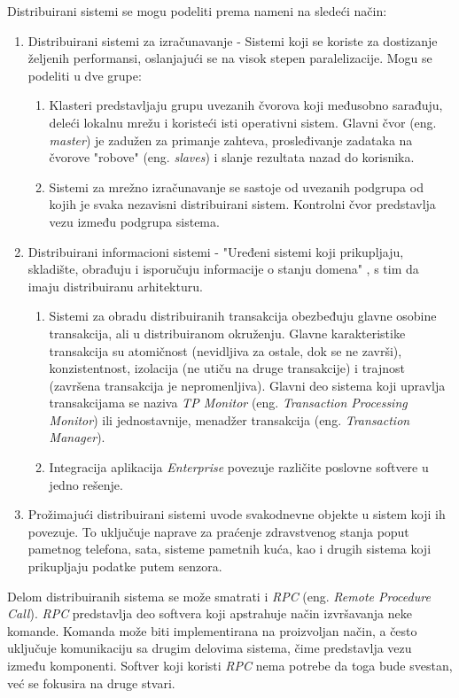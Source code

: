 \documentclass[12pt,oneside]{memoir}
\begin{document}
Distribuirani sistemi se mogu podeliti prema nameni na sledeći način:
\begin{enumerate}
\item Distribuirani sistemi za izračunavanje - Sistemi koji se koriste za dostizanje željenih performansi, oslanjajući se na visok stepen paralelizacije. Mogu se podeliti u dve grupe:
	\begin{enumerate}
	\item Klasteri predstavljaju grupu uvezanih čvorova koji međusobno sarađuju, deleći lokalnu mrežu i koristeći isti operativni sistem. Glavni čvor (eng. \emph{master}) je zadužen za primanje zahteva, prosleđivanje zadataka na čvorove "robove" (eng. \emph{slaves}) i slanje rezultata nazad do korisnika.
	\item Sistemi za mrežno izračunavanje se sastoje od uvezanih podgrupa od kojih je svaka nezavisni distribuirani sistem. Kontrolni čvor predstavlja vezu između podgrupa sistema.
	\end{enumerate}
\item Distribuirani informacioni sistemi - "Uređeni sistemi koji prikupljaju, skladište, obrađuju i isporučuju informacije o stanju domena" \cite{OliveIS}, s tim da imaju distribuiranu arhitekturu.
	\begin{enumerate}
	\item Sistemi za obradu distribuiranih transakcija obezbeđuju glavne osobine transakcija, ali u distribuiranom okruženju. Glavne karakteristike transakcija su atomičnost (nevidljiva za ostale, dok se ne završi), konzistentnost, izolacija (ne utiču na druge transakcije) i trajnost (završena transakcija je nepromenljiva). Glavni deo sistema koji upravlja transakcijama se naziva \emph{TP Monitor} (eng. \emph{Transaction Processing Monitor}) ili jednostavnije, menadžer transakcija (eng. \emph{Transaction Manager}).
	\item Integracija aplikacija \emph{Enterprise} povezuje različite poslovne softvere u jedno rešenje.
	\end{enumerate}
\item Prožimajući distribuirani sistemi uvode svakodnevne objekte u sistem koji ih povezuje. To uključuje naprave za praćenje zdravstvenog stanja poput pametnog telefona, sata, sisteme pametnih kuća, kao i drugih sistema koji prikupljaju podatke putem senzora.
\end{enumerate}

Delom distribuiranih sistema se može smatrati i \emph{RPC} (eng. \emph{Remote Procedure Call}). \emph{RPC} predstavlja deo softvera koji apstrahuje način izvršavanja neke komande. Komanda može biti implementirana na proizvoljan način, a često uključuje komunikaciju sa drugim delovima sistema, čime predstavlja vezu između komponenti. Softver koji koristi \emph{RPC} nema potrebe da toga bude svestan, već se fokusira na druge stvari.
\end{document}
